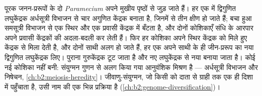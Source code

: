 \begin{proposition}\label{prop:b2:unicellular-diversity:conjugation}
पूरक जनन-प्ररूपों के दो \emph{Paramecium} अपने मुखीय पृष्ठों से जुड़ जाते
हैं। हर एक में द्विगुणित लघुकेंद्रक अर्धसूत्री विभाजन से चार अगुणित
केंद्रक बनाता है, जिनमें से तीन क्षीण हो जाते हैं; बचा हुआ समसूत्री
विभाजन से एक स्थिर और एक प्रवासी केंद्रक में बँटता है, और दोनों कोशिकाएँ
संधि के आरपार अपने प्रवासी केंद्रकों की अदला-बदली कर लेती हैं। फिर हर
कोशिका अपने स्थिर केंद्रक को मिले हुए केंद्रक से मिला देती है, और दोनों
साथी अलग हो जाते हैं, हर एक अपने साथी के ही जीन-प्ररूप का नया द्विगुणित
लघुकेंद्रक लिए। पुराना गुरुकेंद्रक टूट जाता है और नए लघुकेंद्रक से नया
बनाया जाता है। कोई नई कोशिका नहीं बनी: संयुग्मन गुणन से अलग किया गया
आनुवंशिक मिश्रण है --- अर्धसूत्री विभाजन और निषेचन,
\cref{ch:b2:meiosis-heredity}।
जीवाणु-संयुग्मन, जो किसी  को दाता से ग्राही तक एक ही दिशा में
पहुँचाता है, उसी नाम की एक भिन्न प्रक्रिया है
(\cref{ch:b2:genome-diversification})।
\end{proposition}


